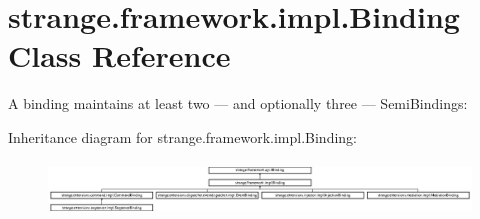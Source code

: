 \hypertarget{classstrange_1_1framework_1_1impl_1_1_binding}{\section{strange.\-framework.\-impl.\-Binding Class Reference}
\label{classstrange_1_1framework_1_1impl_1_1_binding}
}


A binding maintains at least two — and optionally three — Semi\-Bindings\-:  


Inheritance diagram for strange.\-framework.\-impl.\-Binding\-:\begin{figure}[H]
\begin{center}
\leavevmode
\includegraphics[height=1.450777cm]{classstrange_1_1framework_1_1impl_1_1_binding}
\end{center}
\end{figure}
